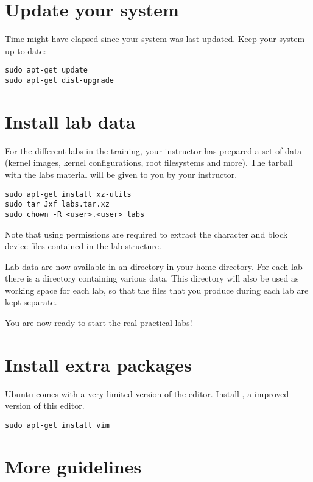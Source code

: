 
\section{Update your system}

Time might have elapsed since your system was last updated. Keep your
system up to date:

\begin{verbatim}
sudo apt-get update
sudo apt-get dist-upgrade
\end{verbatim}

\section{Install lab data}
For the different labs in the training, your instructor has prepared a
set of data (kernel images, kernel configurations, root filesystems
and more). The tarball with the labs material will be given to you by
your instructor.

\begin{verbatim}
sudo apt-get install xz-utils
sudo tar Jxf labs.tar.xz
sudo chown -R <user>.<user> labs
\end{verbatim}

Note that using  permissions are required to extract the
character and block device files contained in the lab structure.

Lab data are now available in an  directory in your home
directory. For each lab there is a directory containing various
data. This directory will also be used as working space for each lab,
so that the files that you produce during each lab are kept separate.

You are now ready to start the real practical labs!

\section{Install extra packages}

Ubuntu comes with a very limited version of the 
editor. Install , a improved version of this editor.

\begin{verbatim}
sudo apt-get install vim
\end{verbatim}

\section{More guidelines}

